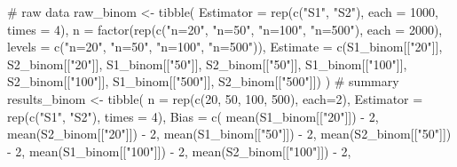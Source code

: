 \documentclass[
]{article}
\newenvironment{Shaded}{\begin{snugshade}}{\end{snugshade}}
\newcommand{\AttributeTok}[1]{\textcolor[rgb]{0.40,0.45,0.13}{#1}}
\newcommand{\CommentTok}[1]{\textcolor[rgb]{0.37,0.37,0.37}{#1}}
\newcommand{\DecValTok}[1]{\textcolor[rgb]{0.68,0.00,0.00}{#1}}
\newcommand{\FunctionTok}[1]{\textcolor[rgb]{0.28,0.35,0.67}{#1}}
\newcommand{\NormalTok}[1]{\textcolor[rgb]{0.00,0.23,0.31}{#1}}
\newcommand{\OtherTok}[1]{\textcolor[rgb]{0.00,0.23,0.31}{#1}}
\newcommand{\SpecialCharTok}[1]{\textcolor[rgb]{0.37,0.37,0.37}{#1}}
\newcommand{\StringTok}[1]{\textcolor[rgb]{0.13,0.47,0.30}{#1}}
\begin{document}
\begin{Shaded}
\begin{Highlighting}[numbers=left,,]
\CommentTok{\# raw data }
\NormalTok{raw\_binom }\OtherTok{\textless{}{-}} \FunctionTok{tibble}\NormalTok{(}
  \AttributeTok{Estimator =} \FunctionTok{rep}\NormalTok{(}\FunctionTok{c}\NormalTok{(}\StringTok{"S1"}\NormalTok{, }\StringTok{"S2"}\NormalTok{), }\AttributeTok{each =} \DecValTok{1000}\NormalTok{, }\AttributeTok{times =} \DecValTok{4}\NormalTok{),}
  \AttributeTok{n =} \FunctionTok{factor}\NormalTok{(}\FunctionTok{rep}\NormalTok{(}\FunctionTok{c}\NormalTok{(}\StringTok{"n=20"}\NormalTok{, }\StringTok{"n=50"}\NormalTok{, }\StringTok{"n=100"}\NormalTok{, }\StringTok{"n=500"}\NormalTok{), }\AttributeTok{each =} \DecValTok{2000}\NormalTok{),}
            \AttributeTok{levels =} \FunctionTok{c}\NormalTok{(}\StringTok{"n=20"}\NormalTok{, }\StringTok{"n=50"}\NormalTok{, }\StringTok{"n=100"}\NormalTok{, }\StringTok{"n=500"}\NormalTok{)),}
  \AttributeTok{Estimate =} \FunctionTok{c}\NormalTok{(S1\_binom[[}\StringTok{"20"}\NormalTok{]], S2\_binom[[}\StringTok{"20"}\NormalTok{]],}
\NormalTok{              S1\_binom[[}\StringTok{"50"}\NormalTok{]], S2\_binom[[}\StringTok{"50"}\NormalTok{]],}
\NormalTok{              S1\_binom[[}\StringTok{"100"}\NormalTok{]], S2\_binom[[}\StringTok{"100"}\NormalTok{]],}
\NormalTok{              S1\_binom[[}\StringTok{"500"}\NormalTok{]], S2\_binom[[}\StringTok{"500"}\NormalTok{]])}
\NormalTok{)}
\CommentTok{\# summary }
\NormalTok{results\_binom }\OtherTok{\textless{}{-}} \FunctionTok{tibble}\NormalTok{(}
  \AttributeTok{n =} \FunctionTok{rep}\NormalTok{(}\FunctionTok{c}\NormalTok{(}\DecValTok{20}\NormalTok{, }\DecValTok{50}\NormalTok{, }\DecValTok{100}\NormalTok{, }\DecValTok{500}\NormalTok{), }\AttributeTok{each=}\DecValTok{2}\NormalTok{),}
  \AttributeTok{Estimator =} \FunctionTok{rep}\NormalTok{(}\FunctionTok{c}\NormalTok{(}\StringTok{"S1"}\NormalTok{, }\StringTok{"S2"}\NormalTok{), }\AttributeTok{times =} \DecValTok{4}\NormalTok{),}
  \AttributeTok{Bias =} \FunctionTok{c}\NormalTok{(}
    \FunctionTok{mean}\NormalTok{(S1\_binom[[}\StringTok{"20"}\NormalTok{]]) }\SpecialCharTok{{-}} \DecValTok{2}\NormalTok{, }\FunctionTok{mean}\NormalTok{(S2\_binom[[}\StringTok{"20"}\NormalTok{]]) }\SpecialCharTok{{-}} \DecValTok{2}\NormalTok{,}
    \FunctionTok{mean}\NormalTok{(S1\_binom[[}\StringTok{"50"}\NormalTok{]]) }\SpecialCharTok{{-}} \DecValTok{2}\NormalTok{, }\FunctionTok{mean}\NormalTok{(S2\_binom[[}\StringTok{"50"}\NormalTok{]]) }\SpecialCharTok{{-}} \DecValTok{2}\NormalTok{,}
    \FunctionTok{mean}\NormalTok{(S1\_binom[[}\StringTok{"100"}\NormalTok{]]) }\SpecialCharTok{{-}} \DecValTok{2}\NormalTok{, }\FunctionTok{mean}\NormalTok{(S2\_binom[[}\StringTok{"100"}\NormalTok{]]) }\SpecialCharTok{{-}} \DecValTok{2}\NormalTok{,}

\end{Highlighting}
\end{Shaded}
\end{document}
